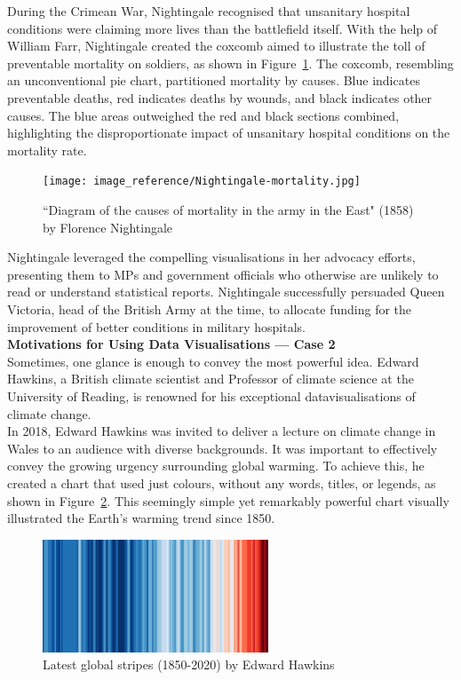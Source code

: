 \documentclass{article}\usepackage[]{graphicx}\usepackage[]{xcolor}
\numberwithin{equation}{section}
\begin{document}
\noindent
During the Crimean War, Nightingale recognised that unsanitary hospital conditions were claiming more lives than the battlefield itself. With the help of William Farr, Nightingale created the coxcomb aimed to illustrate the toll of preventable mortality on soldiers, as shown in Figure~\ref{fig:coxcomb}. The coxcomb, resembling an unconventional pie chart, partitioned mortality by causes. Blue indicates preventable deaths, red indicates deaths by wounds, and black indicates other causes. The blue areas outweighed the red and black sections combined, highlighting the disproportionate impact of unsanitary hospital conditions on the mortality rate.

\begin{figure}[H]
    \centering
    \texttt{[image: image\_reference/Nightingale-mortality.jpg]}
    \caption{``Diagram of the causes of mortality in the army in the East" (1858) by Florence Nightingale \cite{graphFN}}
    \label{fig:coxcomb}
\end{figure}

\noindent
Nightingale leveraged the compelling visualisations in her advocacy efforts, presenting them to MPs and government officials who otherwise are unlikely to read or understand statistical reports. Nightingale successfully persuaded Queen Victoria, head of the British Army at the time, to allocate funding for the improvement of better conditions in military hospitals.\\

\noindent
\textbf{Motivations for Using Data Visualisations — Case 2}
\\
\noindent
Sometimes, one glance is enough to convey the most powerful idea. Edward Hawkins, a British climate scientist and Professor of climate science at the University of Reading, is renowned for his exceptional datavisualisations of climate change.\\

\noindent
In 2018, Edward Hawkins was invited to deliver a lecture on climate change in Wales to an audience with diverse backgrounds. It was important to effectively convey the growing urgency surrounding global warming. To achieve this, he created a chart that used just colours, without any words, titles, or legends, as shown in Figure~\ref{fig:global}. This seemingly simple yet remarkably powerful chart visually illustrated the Earth's warming trend since 1850.

\begin{figure}[H]
    \centering
    \includegraphics[width=0.6\textwidth]{image_reference/global.png}
    \caption{Latest global stripes (1850-2020) by Edward Hawkins \cite{blog}}
    \label{fig:global}
\end{figure}
\end{document}
